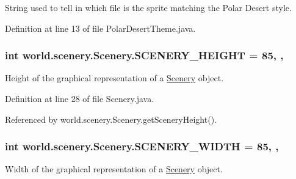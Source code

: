 String used to tell in which file is the sprite matching the Polar Desert style. 



Definition at line 13 of file Polar\-Desert\-Theme.\-java.

\hypertarget{a00024_a106e53ae6e1647395740237ccce7f363}{
\subsubsection[{S\-C\-E\-N\-E\-R\-Y\-\_\-\-H\-E\-I\-G\-H\-T}]{\setlength{\rightskip}{0pt plus 5cm}int world.\-scenery.\-Scenery.\-S\-C\-E\-N\-E\-R\-Y\-\_\-\-H\-E\-I\-G\-H\-T = 85\hspace{0.3cm}{\ttfamily [static]}, {\ttfamily [protected]}, {\ttfamily [inherited]}}}\label{a00024_a106e53ae6e1647395740237ccce7f363}


Height of the graphical representation of a \hyperlink{a00024}{Scenery} object. 



Definition at line 28 of file Scenery.\-java.



Referenced by world.\-scenery.\-Scenery.\-get\-Scenery\-Height().

\hypertarget{a00024_affb047c028883c6d069a03ef0f1caeb8}{
\subsubsection[{S\-C\-E\-N\-E\-R\-Y\-\_\-\-W\-I\-D\-T\-H}]{\setlength{\rightskip}{0pt plus 5cm}int world.\-scenery.\-Scenery.\-S\-C\-E\-N\-E\-R\-Y\-\_\-\-W\-I\-D\-T\-H = 85\hspace{0.3cm}{\ttfamily [static]}, {\ttfamily [protected]}, {\ttfamily [inherited]}}}\label{a00024_affb047c028883c6d069a03ef0f1caeb8}


Width of the graphical representation of a \hyperlink{a00024}{Scenery} object. 



